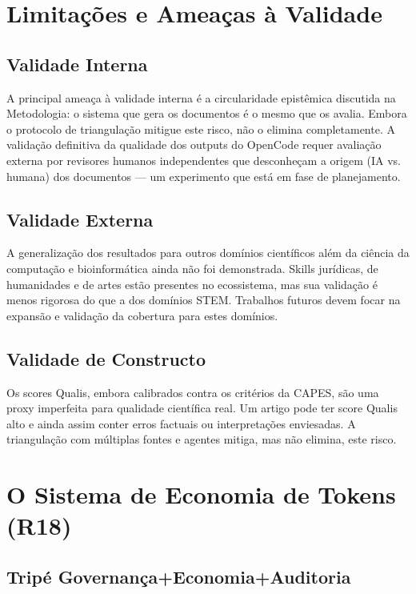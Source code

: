 \section{Limitações e Ameaças à Validade}

\subsection{Validade Interna}

A principal ameaça à validade interna é a circularidade epistêmica discutida na Metodologia: o sistema que gera os documentos é o mesmo que os avalia. Embora o protocolo de triangulação mitigue este risco, não o elimina completamente. A validação definitiva da qualidade dos outputs do OpenCode requer avaliação externa por revisores humanos independentes que desconheçam a origem (IA vs. humana) dos documentos --- um experimento que está em fase de planejamento.

\subsection{Validade Externa}

A generalização dos resultados para outros domínios científicos além da ciência da computação e bioinformática ainda não foi demonstrada. Skills jurídicas, de humanidades e de artes estão presentes no ecossistema, mas sua validação é menos rigorosa do que a dos domínios STEM. Trabalhos futuros devem focar na expansão e validação da cobertura para estes domínios.

\subsection{Validade de Constructo}

Os scores Qualis, embora calibrados contra os critérios da CAPES, são uma proxy imperfeita para qualidade científica real. Um artigo pode ter score Qualis alto e ainda assim conter erros factuais ou interpretações enviesadas. A triangulação com múltiplas fontes e agentes mitiga, mas não elimina, este risco.

\section{O Sistema de Economia de Tokens (R18)}

\subsection{Tripé Governança+Economia+Auditoria}

